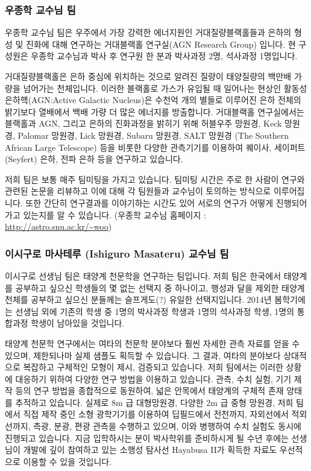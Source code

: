 \subsubsection{우종학 교수님 팀}
우종학 교수님 팀은 우주에서 가장 강력한 에너지원인 거대질량블랙홀들과 은하의 형성 및 진화에 대해 연구하는 거대블랙홀 연구실(AGN Research Group) 입니다. 현 구성원은  우종학 교수님과 박사 후 연구원 한 분과 박사과정 2명, 석사과정 1명입니다.

거대질량블랙홀은 은하 중심에 위치하는 것으로 알려진 질량이 태양질량의 백만배 가량을 넘어가는 천체입니다. 이러한 블랙홀로 가스가 유입될 때 일어나는 현상인 활동성은하핵(AGN:Active Galactic Nucleus)은 수천억 개의 별들로 이루어진 은하 전체의 밝기보다 열배에서 백배 가량 더 많은 에너지를 방출합니다. 거대블랙홀 연구실에서는 블랙홀과 AGN, 그리고 은하의 진화과정을 밝히기 위해 허블우주 망원경, Keck 망원경, Palomar 망원경, Lick 망원경, Subaru 망원경, SALT 망원경 (The Southern African Large Telescope) 등을 비롯한 다양한 관측기기를 이용하여 퀘이사, 세이퍼트(Seyfert) 은하, 전파 은하 등을 연구하고 있습니다.

저희 팀은 보통 매주 팀미팅을 가지고 있습니다. 팀미팅 시간은 주로 한 사람이 연구와 관련된 논문을 리뷰하고 이에 대해 각 팀원들과 교수님이 토의하는 방식으로 이루어집니다. 또한 간단히 연구결과를 이야기하는 시간도 있어 서로의 연구가 어떻게 진행되어가고 있는지를 알 수 있습니다. 
(우종학 교수님 홈페이지 : \url{http://astro.snu.ac.kr/~woo})

\subsubsection{이시구로 마사테루 (Ishiguro Masateru) 교수님 팀}
이시구로 선생님 팀은 태양계 천문학을 연구하는 팀입니다. 저희 팀은 한국에서 태양계를 공부하고 싶으신 학생들의 몇 없는 선택지 중 하나이고, 행성과 달을 제외한 태양계 천체를 공부하고 싶으신 분들께는 슬프게도(?) 유일한 선택지입니다. 2014년 봄학기에는 선생님 외에 기존의 학생 중 1명의 박사과정 학생과 1명의 석사과정 학생, 1명의 통합과정 학생이 남아있을 것입니다.

태양계 천문학 연구에서는 여타의 천문학 분야보다 훨씬 자세한 관측 자료를 얻을 수 있으며, 제한되나마 실제 샘플도 획득할 수 있습니다. 그 결과, 여타의 분야보다 상대적으로 복잡하고 구체적인 모형이 제시, 검증되고 있습니다. 저희 팀에서는 이러한 상황에 대응하기 위하여 다양한 연구 방법을 이용하고 있습니다. 관측, 수치 실험, 기기 제작 등의 연구 방법을 종합적으로 동원하여, 넓은 안목에서 태양계의 구체적 존재 양태를 추적하고 있습니다. 실제로 8m 급 대형망원경, 다양한 2m 급 중형 망원경, 저희 팀에서 직접 제작 중인 소형 광학기기를 이용하여 딥필드에서 전천까지, 자외선에서 적외선까지, 측광, 분광, 편광 관측을 수행하고 있으며, 이와 병행하여 수치 실험도 동시에 진행되고 있습니다. 지금 입학하시는 분이 박사학위를 준비하시게 될 수년 후에는 선생님이 개발에 깊이 참여하고 있는 소행성 탐사선 Hayabusa II가 획득한 자료도 우선적으로 이용할 수 있을 것입니다.

